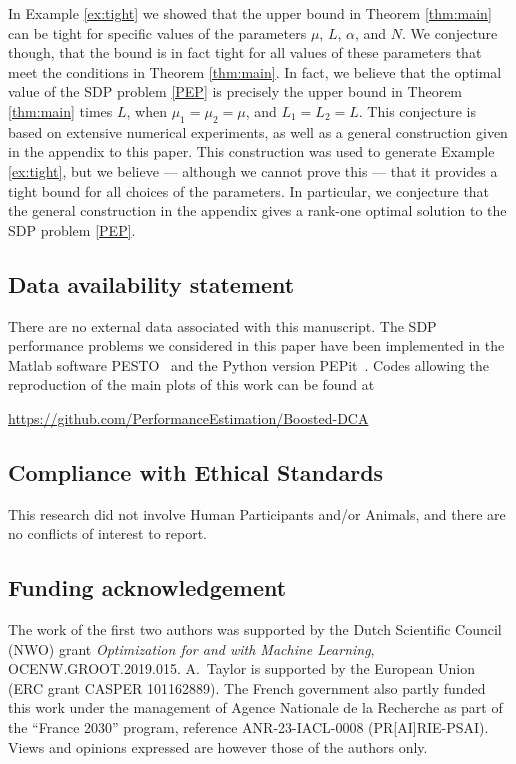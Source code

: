 \documentclass{article} %
\begin{document}
\begin{enumerate}
{\item 
In Example \ref{ex:tight} we showed that the upper bound in Theorem \ref{thm:main} can be tight for specific values of the parameters $\mu$, $L$, $\alpha$, and $N$.
We conjecture though, that the bound is in fact tight for all values of these parameters that meet the conditions in 
Theorem \ref{thm:main}. In fact, we believe that the optimal value of the SDP problem \eqref{PEP} is precisely the upper bound in Theorem \ref{thm:main} times $L$, when $\mu_1 = \mu_2 = \mu$, and $L_1 = L_2 = L$. This conjecture is based on extensive numerical experiments, as well as a general construction given in the appendix to this paper. This construction was used to generate Example \ref{ex:tight}, but we believe --- although we cannot prove this --- that it provides a tight bound for all choices of the parameters.
In particular, we conjecture that the general construction in the appendix gives a rank-one optimal solution to the SDP problem \eqref{PEP}. 
}
\end{enumerate}


\subsection*{Data availability statement}
There are no external data associated with this manuscript. The SDP performance problems we considered in this paper have been implemented in the Matlab software PESTO~\cite{pesto2017} and the Python version PEPit~\cite{pepit2024}. Codes allowing the reproduction of the main plots of this work can be found at
\begin{center}
\url{https://github.com/PerformanceEstimation/Boosted-DCA}
\end{center}

\subsection*{Compliance with Ethical Standards}
This research did not involve Human Participants and/or Animals, and there are no conflicts of interest to report.

\subsection*{Funding acknowledgement}
The work of the first two authors was supported by the
 Dutch Scientific Council (NWO)  grant \emph{Optimization for and with Machine Learning}, OCENW.GROOT.2019.015. A.~Taylor is supported by the European
Union (ERC grant CASPER 101162889). The French government also partly funded this work under the management
 of Agence Nationale de la Recherche as part of the “France 2030” program, reference ANR-23-IACL-0008 (PR[AI]RIE-PSAI). 
 Views and opinions expressed are however those of the authors only.
\end{document}
